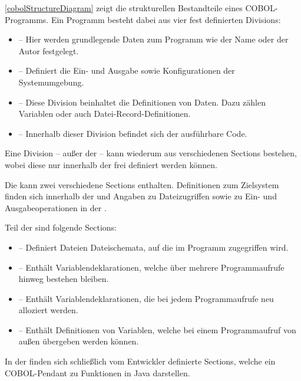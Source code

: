 \autoref{cobolStructureDiagram} zeigt die strukturellen Bestandteile eines COBOL-Programms. 
Ein Programm besteht dabei aus vier fest definierten Divisions:

\begin{itemize}
    \item {} -- Hier werden grundlegende Daten zum Programm wie der Name oder der Autor festgelegt.
    \item {} -- Definiert die Ein- und Ausgabe sowie Konfigurationen der Systemumgebung.
    \item {} -- Diese Division beinhaltet die Definitionen von Daten. Dazu zählen Variablen oder auch Datei-Record-Definitionen.
    \item {} -- Innerhalb dieser Division befindet sich der ausführbare Code.
\end{itemize}

Eine Division -- außer der  -- kann wiederum aus verschiedenen Sections bestehen, wobei diese nur innerhalb der  frei definiert werden können.

Die  kann zwei verschiedene Sections enthalten. Definitionen zum Zielsystem finden sich innerhalb der  und Angaben zu Dateizugriffen sowie zu Ein- und Ausgabeoperationen in der .

Teil der  sind folgende Sections:
\begin{itemize}
    \item {} -- Definiert Dateien \bzw Dateischemata, auf die im Programm zugegriffen wird.
    \item {} -- Enthält Variablendeklarationen, welche über mehrere Programmaufrufe hinweg bestehen bleiben.
    \item {} -- Enthält Variablendeklarationen, die bei jedem Programmaufrufe neu alloziert werden.
    \item {} -- Enthält Definitionen von Variablen, welche bei einem Programmaufruf von außen übergeben werden können.
\end{itemize}

In der  finden sich schließlich vom Entwickler definierte Sections, welche ein COBOL-Pendant zu Funktionen in Java darstellen.

